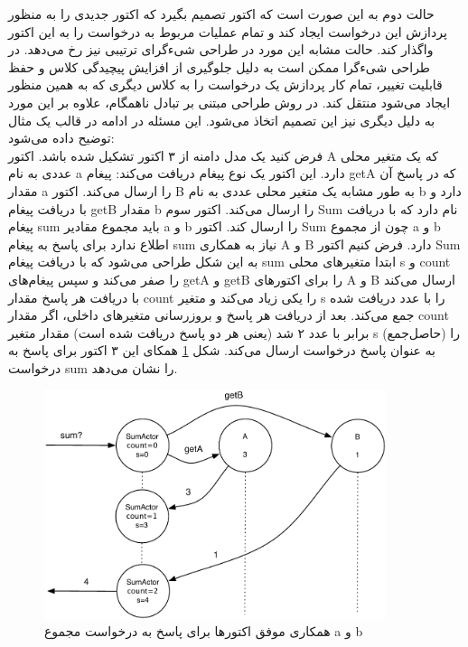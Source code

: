 حالت دوم  به این صورت است که اکتور تصمیم بگیرد که اکتور جدیدی را به منظور پردازش این درخواست ایجاد کند و تمام عملیات مربوط به درخواست را به این اکتور واگذار کند. حالت مشابه‌ این مورد در طراحی شیءگرای ترتیبی نیز رخ می‌دهد. در طراحی شیءگرا ممکن است به دلیل جلوگیری از افزایش پیچیدگی کلاس و  حفظ قابلیت تغییر، تمام کار پردازش یک درخواست را به کلاس دیگری که به همین منظور ایجاد می‌شود منتقل کند. در روش طراحی مبتنی بر تبادل ناهمگام، علاوه بر این مورد به دلیل دیگری نیز این تصمیم اتخاذ می‌شود. این مسئله در ادامه در قالب یک مثال توضیح داده می‌شود:\\
فرض کنید یک مدل دامنه از ۳ اکتور تشکیل شده باشد. اکتور A که یک متغیر محلی عددی به نام a دارد. این اکتور یک نوع پیغام دریافت می‌کند: پیغام getA که در پاسخ آن مقدار a را ارسال می‌کند. اکتور B به طور مشابه یک متغیر محلی عددی به نام b دارد و با دریافت پیغام getB مقدار b را ارسال می‌کند. اکتور سوم Sum نام دارد که با دریافت پیغام sum باید مجموع مقادیر a و b را ارسال کند. اکتور Sum چون از مجموع a و b اطلاع ندارد برای پاسخ به پیغام sum نیاز به همکاری A و B دارد. فرض کنیم اکتور Sum به این شکل طراحی می‌شود که با دریافت پیغام sum ابتدا متغیرهای محلی s و count را صفر می‌کند و سپس پیغام‌های getA و getB را برای اکتورهای A و B ارسال می‌کند با دریافت هر پاسخ مقدار count را یکی زیاد می‌کند و متغیر s را با عدد دریافت شده جمع می‌کند. بعد از دریافت هر پاسخ و بروزرسانی متغیرهای داخلی، اگر مقدار count برابر با عدد ۲ شد (یعنی هر دو پاسخ دریافت شده است) مقدار متغیر s (حاصل‌جمع) را به عنوان پاسخ درخواست ارسال می‌کند. شکل \ref{fig:coord1} همکای این ۳ اکتور برای پاسخ به درخواست sum را نشان می‌دهد.
\begin{figure}[h]
    \begin{center}
	\includegraphics[width=10cm]{4-ProposedFramework/Figures/ExampleCoord1.pdf}
    \end{center}
    \caption{\label{fig:coord1} همکاری موفق اکتورها برای پاسخ به درخواست مجموع a و b}
\end{figure}
